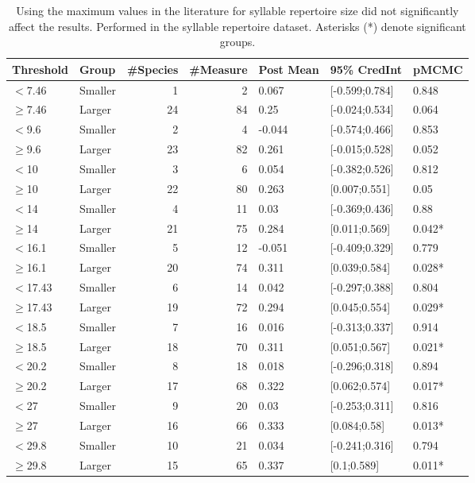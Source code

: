 \documentclass{article}
\begin{document}
  \begin{table}[H]
  \centering
  \caption{Using the maximum values in the literature for syllable repertoire size did not significantly affect the results. Performed in the syllable repertoire dataset. Asterisks (*) denote significant groups.} 
  \begin{tabular}{llrrlll}
  \hline
  Threshold & Group & \#Species & \#Measure & Post Mean & 95\% CredInt & pMCMC \\ 
  \hline
  $<$7.46 & Smaller & 1 & 2 & 0.067 & [-0.599;0.784] & 0.848 \\ 
  $\ge$7.46 & Larger & 24 & 84 & 0.25 & [-0.024;0.534] & 0.064 \\ 
  $<$9.6 & Smaller & 2 & 4 & -0.044 & [-0.574;0.466] & 0.853 \\ 
  $\ge$9.6 & Larger & 23 & 82 & 0.261 & [-0.015;0.528] & 0.052 \\ 
  $<$10 & Smaller & 3 & 6 & 0.054 & [-0.382;0.526] & 0.812 \\ 
  $\ge$10 & Larger & 22 & 80 & 0.263 & [0.007;0.551] & 0.05 \\ 
  $<$14 & Smaller & 4 & 11 & 0.03 & [-0.369;0.436] & 0.88 \\ 
  $\ge$14 & Larger & 21 & 75 & 0.284 & [0.011;0.569] & 0.042* \\ 
  $<$16.1 & Smaller & 5 & 12 & -0.051 & [-0.409;0.329] & 0.779 \\ 
  $\ge$16.1 & Larger & 20 & 74 & 0.311 & [0.039;0.584] & 0.028* \\ 
  $<$17.43 & Smaller & 6 & 14 & 0.042 & [-0.297;0.388] & 0.804 \\ 
  $\ge$17.43 & Larger & 19 & 72 & 0.294 & [0.045;0.554] & 0.029* \\ 
  $<$18.5 & Smaller & 7 & 16 & 0.016 & [-0.313;0.337] & 0.914 \\ 
  $\ge$18.5 & Larger & 18 & 70 & 0.311 & [0.051;0.567] & 0.021* \\ 
  $<$20.2 & Smaller & 8 & 18 & 0.018 & [-0.296;0.318] & 0.894 \\ 
  $\ge$20.2 & Larger & 17 & 68 & 0.322 & [0.062;0.574] & 0.017* \\ 
  $<$27 & Smaller & 9 & 20 & 0.03 & [-0.253;0.311] & 0.816 \\ 
  $\ge$27 & Larger & 16 & 66 & 0.333 & [0.084;0.58] & 0.013* \\ 
  $<$29.8 & Smaller & 10 & 21 & 0.034 & [-0.241;0.316] & 0.794 \\ 
  $\ge$29.8 & Larger & 15 & 65 & 0.337 & [0.1;0.589] & 0.011* \\ 

\end{tabular}
\end{table}
\end{document}
